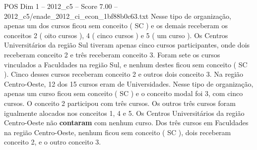 \begin{textsample}{POS Dim 1 – 2012\_c5 – Score 7.00 – 2012\_c5/enade\_2012\_ci\_econ\_1bf88b0c63.txt}
Nesse tipo de organização, apenas um dos cursos ficou sem conceito ( SC ) e os demais receberam os conceitos 2 ( oito cursos ), 4 ( cinco cursos ) e 5 ( um curso ).
Os Centros Universitários da região Sul tiveram apenas cinco cursos participantes, onde dois receberam conceito 2 e três receberam conceito 3.
Foram sete os cursos vinculados a Faculdades na região Sul, e nenhum destes ficou sem conceito ( SC ).
Cinco desses cursos receberam conceito 2 e outros dois conceito 3.
Na região Centro-Oeste, 12 dos 15 cursos eram de Universidades.
Nesse tipo de organização, apenas um curso ficou sem conceito ( SC ) e o conceito modal foi 3, com cinco cursos.
O conceito 2 participou com três cursos.
Os outros três cursos foram igualmente alocados nos conceitos 1, 4 e 5.
Os Centros Universitários da região Centro-Oeste não \textbf{contaram} com nenhum curso.
Dos três cursos em Faculdades na região Centro-Oeste, nenhum ficou sem conceito ( SC ), dois receberam conceito 2, e o outro conceito 3.

\end{textsample}
